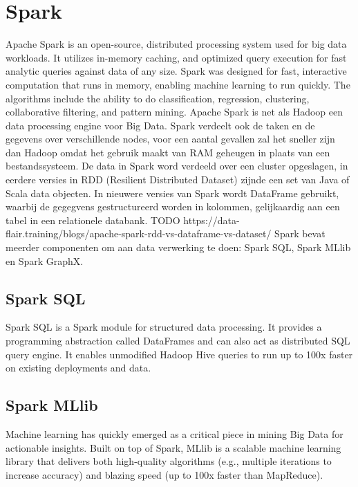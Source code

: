 \section{Spark}
Apache Spark is an open-source, distributed processing system used for big data workloads. It utilizes in-memory caching, and optimized query execution for fast analytic queries against data of any size.
Spark was designed for fast, interactive computation that runs in memory, enabling machine learning to run quickly. The algorithms include the ability to do classification, regression, clustering, collaborative filtering, and pattern mining.\autocite{AwsAmazon2023a}
\newline
\newline
Apache Spark is net als Hadoop een data processing engine voor Big Data. Spark verdeelt ook de taken en de gegevens over verschillende nodes, voor een aantal gevallen zal het sneller zijn dan Hadoop omdat het gebruik maakt van RAM geheugen in plaats van een bestandssysteem.
De data in Spark word verdeeld over een cluster opgeslagen, in eerdere versies in RDD (Resilient Distributed Dataset) zijnde een set van Java of Scala data objecten. In nieuwere versies van Spark wordt DataFrame gebruikt, waarbij de gegegvens gestructureerd worden in kolommen, gelijkaardig aan een tabel in een relationele databank.
TODO https://data-flair.training/blogs/apache-spark-rdd-vs-dataframe-vs-dataset/
\newline
\newline
Spark bevat meerder componenten om aan data verwerking te doen: Spark SQL, Spark MLlib en Spark GraphX.

\subsection{Spark SQL}
Spark SQL is a Spark module for structured data processing. It provides a programming abstraction called DataFrames and can also act as distributed SQL query engine. It enables unmodified Hadoop Hive queries to run up to 100x faster on existing deployments and data.\autocite{databricks2023}

\subsection{Spark MLlib}
Machine learning has quickly emerged as a critical piece in mining Big Data for actionable insights. Built on top of Spark, MLlib is a scalable machine learning library that delivers both high-quality algorithms (e.g., multiple iterations to increase accuracy) and blazing speed (up to 100x faster than MapReduce).\autocite{databricks2023}

